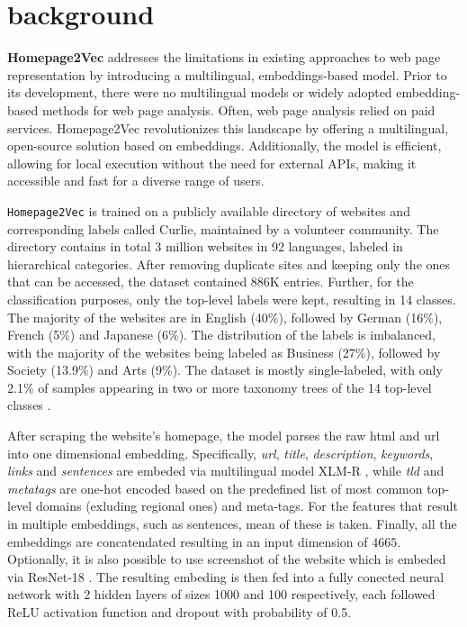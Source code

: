 \section{background}\label{sec:background}
\textbf{Homepage2Vec} addresses the limitations in existing approaches to web page representation by introducing a multilingual, embeddings-based model. Prior to its development, there were no multilingual models or widely adopted embedding-based methods for web page analysis. Often, web page analysis relied on paid services. Homepage2Vec revolutionizes this landscape by offering a multilingual, open-source solution based on embeddings. Additionally, the model is efficient, allowing for local execution without the need for external APIs, making it accessible and fast for a diverse range of users.

\texttt{Homepage2Vec} is trained on a publicly available directory of websites and corresponding labels called Curlie, maintained by a volunteer community. The directory contains in total 3 million websites in 92 languages, labeled in hierarchical categories. After removing duplicate sites and keeping only the ones that can be accessed, the dataset contained 886K entries. Further, for the classification purposes, only the top-level labels were kept, resulting in 14 classes. The majority of the websites are in English (40\%), followed by German (16\%), French (5\%) and Japanese (6\%). The distribution of the labels is imbalanced, with the majority of the websites being labeled as Business (27\%), followed by Society (13.9\%) and Arts (9\%). The dataset is mostly single-labeled, with only 2.1\% of samples appearing in two or more taxonomy trees of the 14 top-level classes \cite{homepage2vec}.

After scraping the website's homepage, the model parses the raw html and url into one dimensional embedding. Specifically, \textit{url}, \textit{title}, \textit{description}, \textit{keywords}, \textit{links} and \textit{sentences} are embeded via multilingual model XLM-R \cite{xmlr}, while \textit{tld} and \textit{metatags} are one-hot encoded based on the predefined list of most common top-level domains (exluding regional ones) and meta-tags. For the features that result in multiple embeddings, such as sentences, mean of these is taken. Finally, all the embeddings are concatendated resulting in an input dimension of $4665$. Optionally, it is also possible to use screenshot of the website which is embeded via ResNet-18 \cite{resnet}. The resulting embeding is then fed into a fully conected neural network with 2 hidden layers of sizes 1000 and 100 respectively, each followed ReLU activation function and dropout with probability of 0.5. 
